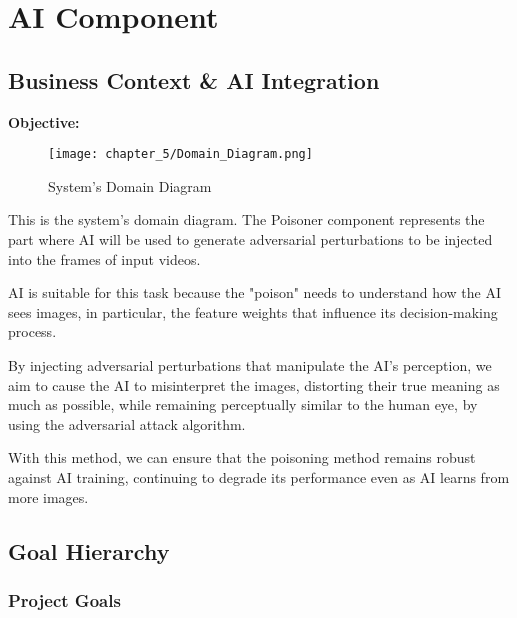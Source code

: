 \chapter{AI Component}
\label{chap:ai-component}

\section{Business Context & AI Integration}
\label{section:business-context-and-AI-integration}
\textbf{Objective:}

\begin{figure}[h]
    \centering
    \texttt{[image: chapter\_5/Domain\_Diagram.png]}
    \caption{System's Domain Diagram}
\end{figure}

This is the system's domain diagram. The Poisoner component represents the part where AI will be used to generate adversarial perturbations to be injected into the frames of input videos.


AI is suitable for this task because the "poison" needs to understand how the AI sees images, in particular, the feature weights that influence its decision-making process. 

By injecting adversarial perturbations that manipulate the AI’s perception, we aim to cause the AI to misinterpret the images, distorting their true meaning as much as possible, while remaining perceptually similar to the human eye, by using the adversarial attack algorithm.

With this method, we can ensure that the poisoning method remains robust against AI training, continuing to degrade its performance even as AI learns from more images.

\section{Goal Hierarchy}
\label{section:goal-hierarchy}

\subsection{Project Goals}

